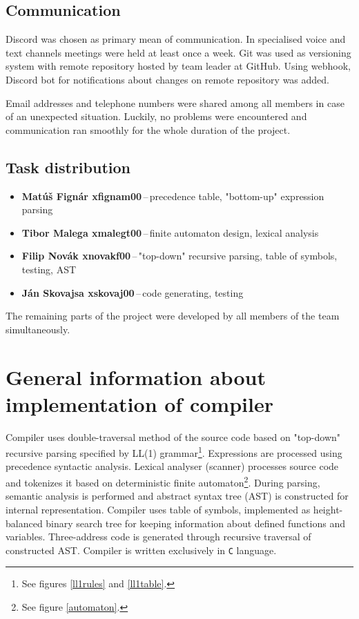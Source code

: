 \documentclass[a4paper, 11pt]{article}
\begin{document}
\subsection{Communication}\label{sec:COMM}
Discord was chosen as primary mean of communication. In specialised voice and text channels meetings were
held at least once a week. Git was used as versioning system with remote repository hosted by team leader at
GitHub. Using webhook, Discord bot for notifications about changes on remote repository was added.\par
Email addresses and telephone numbers were shared among all members in case of an unexpected situation.
Luckily, no problems were encountered and communication ran smoothly for the whole duration of the project.

\subsection{Task distribution}\label{sec:TASKS}
\begin{itemize}

    \item \textbf{Matúš Fignár xfignam00}\,--\,precedence table, "bottom-up" expression parsing
    \item \textbf{Tibor Malega xmalegt00}\,--\,finite automaton design, lexical analysis
    \item \textbf{Filip Novák xnovakf00}\,--\,"top-down" recursive parsing, table of symbols, testing, AST
    \item \textbf{Ján Skovajsa xskovaj00}\,--\,code generating, testing

\end{itemize}
The remaining parts of the project were developed by all members of the team simultaneously.

\section{General information about implementation of compiler}
Compiler uses double-traversal method of the source code based on "top-down" recursive parsing specified by
LL(1) grammar\footnote{See figures \ref{ll1rules} and \ref{ll1table}.}. Expressions are processed using precedence syntactic
analysis. Lexical analyser (scanner) processes source code and tokenizes it based on deterministic finite automaton\footnote{See figure \ref{automaton}.}.
During parsing, semantic analysis is performed and abstract syntax tree (AST) is constructed for internal representation.
Compiler uses table of symbols, implemented as height-balanced binary search tree for keeping information about defined functions and variables.
Three-address code is generated through recursive traversal of constructed AST. Compiler is written exclusively in \verb|C| language.
\end{document}
